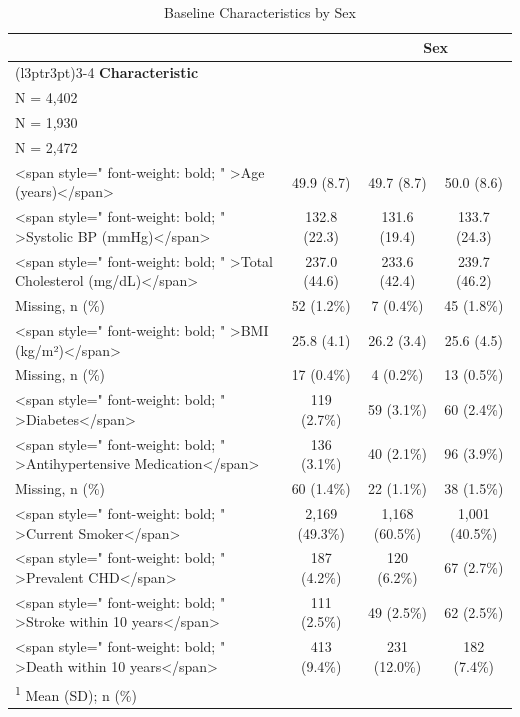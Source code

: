 \begin{table}

\caption{Baseline Characteristics by Sex}
\centering
\begin{tabular}[t]{lccc}
\toprule
\multicolumn{2}{c}{ } & \multicolumn{2}{c}{\textbf{Sex}} \\
\cmidrule(l{3pt}r{3pt}){3-4}
\textbf{Characteristic} & \makecell[c]{\textbf{Overall}\ \ \\N = 4,402} & \makecell[c]{\textbf{Men}\ \ \\N = 1,930} & \makecell[c]{\textbf{Women}\ \ \\N = 2,472}\\
\midrule
<span style=" font-weight: bold;    " >Age (years)</span> & 49.9 (8.7) & 49.7 (8.7) & 50.0 (8.6)\\
<span style=" font-weight: bold;    " >Systolic BP (mmHg)</span> & 132.8 (22.3) & 131.6 (19.4) & 133.7 (24.3)\\
<span style=" font-weight: bold;    " >Total Cholesterol (mg/dL)</span> & 237.0 (44.6) & 233.6 (42.4) & 239.7 (46.2)\\
\hspace{1em}Missing, n (\%) & 52 (1.2\%) & 7 (0.4\%) & 45 (1.8\%)\\
<span style=" font-weight: bold;    " >BMI (kg/m²)</span> & 25.8 (4.1) & 26.2 (3.4) & 25.6 (4.5)\\
\addlinespace
\hspace{1em}Missing, n (\%) & 17 (0.4\%) & 4 (0.2\%) & 13 (0.5\%)\\
<span style=" font-weight: bold;    " >Diabetes</span> & 119 (2.7\%) & 59 (3.1\%) & 60 (2.4\%)\\
<span style=" font-weight: bold;    " >Antihypertensive Medication</span> & 136 (3.1\%) & 40 (2.1\%) & 96 (3.9\%)\\
\hspace{1em}Missing, n (\%) & 60 (1.4\%) & 22 (1.1\%) & 38 (1.5\%)\\
<span style=" font-weight: bold;    " >Current Smoker</span> & 2,169 (49.3\%) & 1,168 (60.5\%) & 1,001 (40.5\%)\\
\addlinespace
<span style=" font-weight: bold;    " >Prevalent CHD</span> & 187 (4.2\%) & 120 (6.2\%) & 67 (2.7\%)\\
<span style=" font-weight: bold;    " >Stroke within 10 years</span> & 111 (2.5\%) & 49 (2.5\%) & 62 (2.5\%)\\
<span style=" font-weight: bold;    " >Death within 10 years</span> & 413 (9.4\%) & 231 (12.0\%) & 182 (7.4\%)\\
\bottomrule
\multicolumn{4}{l}{\rule{0pt}{1em}\textsuperscript{1} Mean (SD); n (\%)}\\
\end{tabular}
\end{table}
